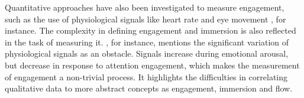 Quantitative approaches have also been investigated to measure engagement, such as the use of physiological signals like heart rate \parencite{ravaja20051} and eye movement \parencite{jennett2008measuring}, for instance. The complexity in defining engagement and immersion is also reflected in the task of measuring it. \textcite{ravaja20051}, for instance, mentions the significant variation of physiological signals as an obstacle. Signals increase during emotional arousal, but decrease in response to attention engagement, which makes the measurement of engagement a non-trivial process. It highlights the difficulties in correlating qualitative data to more abstract concepts as engagement, immersion and flow.


